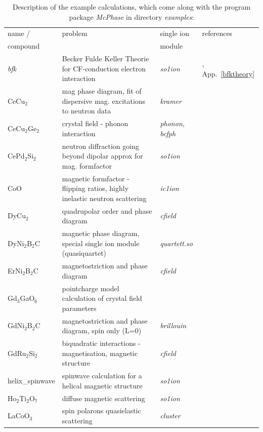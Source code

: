 \documentclass[twoside]{article}
\newcommand{\prg}{\sl}
\begin{document}
\begin{table}[thb] 
\begin{center}  
\caption {Description of the example calculations, which come along with the program package {\prg McPhase} in directory {\prg %
examples}:}   
\label{examples}   
\begin{tabular} 
{l|l|l|l}
name /       & problem & single ion & references \\ 
compound     &          & module  &             \\
\hline
{\prg bfk }    & Becker Fulde Keller Theorie for CF-conduction electron interaction & {\prg so1ion }\index{bfk} &  \cite{becker77-9}, App.~\ref{bfktheory} \\
CeCu$_2$  & mag phase diagram, fit of dispersive mag. excitations to neutron data & {\prg kramer}\index{kramer} & \cite{loewenhaupt06-775,schedler03-1313} \\
CeCu$_2$Ge$_2$ & crystal field - phonon interaction & {\prg phonon, bcfph }  & \\
CePd$_2$Si$_2$ & neutron diffraction going beyond dipolar approx for mag. formfactor & {\prg %
so1ion}&\cite{rotter09-140405} \\
CoO & magnetic formfactor - flipping ratios, highly inelastic neutron scattering  &{\prg  ic1ion} & \\
DyCu$_2$ & quadrupolar order and phase diagram & {\prg cfield}\index{cfield}&\cite{yoshida98-1421} \\
DyNi$_2$B$_2$C & magnetic phase diagram, special single ion module (quasiquartet) & {\prg %
quartett.so}\index{quartett.so}& \\
ErNi$_2$B$_2$C & magnetostriction and phase diagram & {\prg cfield}&\cite{doerr02-5609}\\
Gd$_3$GaO$_6$  & pointcharge model calculation of crystal field parameters & & \\ 
GdNi$_2$B$_2$C & magnetostriction and phase diagram, spin only (L=0) & {\prg brillouin}\index{brillouin}& \cite{doerr02-5609}\\
GdRu$_2$Si$_2$ & biquadratic interactions - magnetisation, magnetic structure & {\prg cfield} & \\
helix\_spinwave & spinwave calculation for a helical magnetic structure & {\prg so1ion} & \\
Ho$_2$Ti$_2$O$_7$ & diffuse magnetic scattering & {\prg so1ion} & \cite{bramwell01-1495}\\
LaCoO$_3$ & spin polarons quasielastic scattering & {\prg cluster}\index{cluster} & \cite{podlesnyak11-134430,podlesnyak08-247603} \\

\end{tabular}
\end{center}
\end{table}
\end{document}

